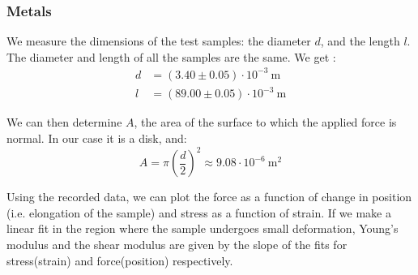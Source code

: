 \documentclass{scrartcl}
\begin{document}
\subsubsection{Metals}

We measure the dimensions of the test samples: the diameter $d$, and the length $l$. The diameter and length of all the samples are the same. We get : 
\begin{align}
d &= (3.40 \pm 0.05) \cdot 10^{-3} \ \text{m} \\ l &= (89.00 \pm 0.05) \cdot 10^{-3} \ \text{m} 
\end{align} 

We can then determine $A$, the area of the surface to which the applied force is normal. In our case it is a disk, and: \begin{equation}
    A = \pi \left( \frac{d}{2} \right)^2 \approx 9.08 \cdot 10^{-6} \ \text{m}^2
\end{equation}

Using the recorded data, we can plot the force as a function of change in position (i.e. elongation of the sample) and stress as a function of strain. If we make a linear fit in the region where the sample undergoes small deformation, Young's modulus and the shear modulus are given by the slope of the fits for stress(strain) and force(position) respectively.
\end{document}
